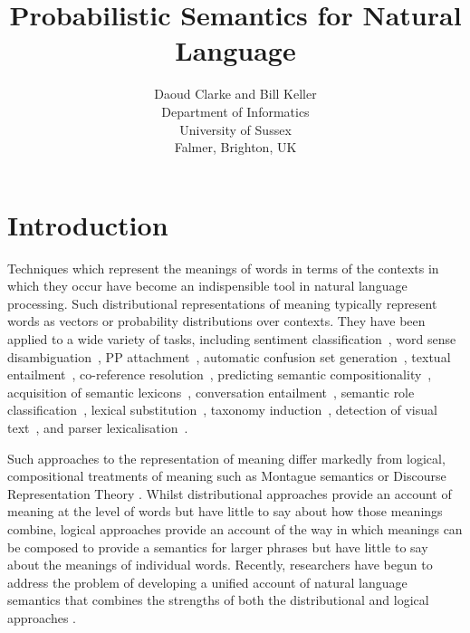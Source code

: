 \documentclass[letterpaper]{article}
\begin{document}
%
\title{Probabilistic Semantics for Natural Language}
\author{Daoud Clarke and Bill Keller\\
Department of Informatics\\
University of Sussex\\
Falmer, Brighton, UK\\
}
\maketitle



\section{Introduction}

Techniques which represent the meanings of words in terms of the contexts in
which they occur have become an indispensible tool in natural language
processing. Such distributional representations of meaning typically
represent words as vectors or probability distributions over
contexts. They have been applied to a wide variety of tasks,
including sentiment classification~\cite{Bollegala2011}, word sense
disambiguation~\cite{miller-EtAl:2012:PAPERS,khapra-EtAl:2010:ACL}, PP
attachment~\cite{Calvo05distributionalthesaurus}, automatic confusion
set generation~\cite{xue-hwa:2012:PAPERS}, textual
entailment~\cite{berant-dagan-goldberger:2010:ACL}, co-reference
resolution~\cite{lee-EtAl:2012:EMNLP-CoNLL}, predicting semantic
compositionality~\cite{bergsma-EtAl:2010:EMNLP}, acquisition of
semantic lexicons~\cite{mcintosh:2010:EMNLP}, conversation
entailment~\cite{zhang-chai:2010:EMNLP}, semantic role
classification~\cite{zapirain-EtAl:2010:NAACLHLT}, lexical
substitution~\cite{szarvas-biemann-gurevych:2013:NAACL-HLT}, taxonomy
induction~\cite{fountain-lapata:2012:NAACL-HLT}, detection of visual
text~\cite{dodge-EtAl:2012:NAACL-HLT}, and parser
lexicalisation~\cite{rei-briscoe:2013:NAACL-HLT}.

Such approaches to the representation of meaning differ markedly from logical, compositional treatments of meaning
such as Montague semantics or
Discourse Representation Theory \cite{Blackburn:05}. Whilst distributional approaches provide an account of meaning at the level of words but have little to say about how those meanings combine, logical approaches provide an account of the way in which meanings can be composed to provide a semantics for larger phrases but have little to say about the meanings of individual words. 
Recently, researchers have begun to address the problem of  developing a unified account of natural language semantics that combines the strengths of both the distributional and logical approaches
\cite{Clarke:07,Coecke:10,Garrette:11,Lewis:13}. 
\end{document}
